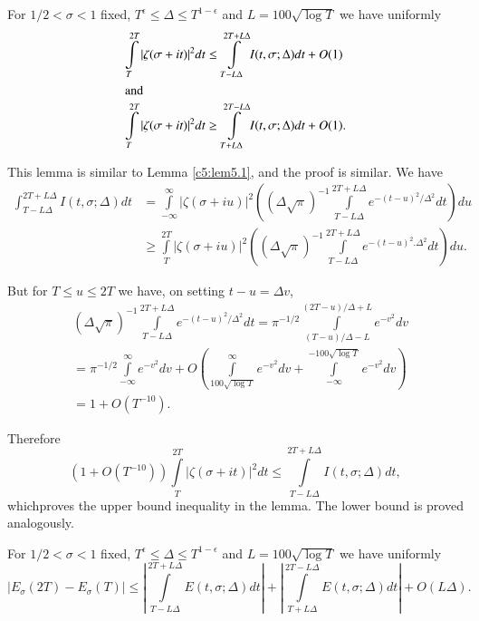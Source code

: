 \begin{lemma}\label{c2:lem2.4}
  For $1/2 < \sigma < 1$ fixed, $T^\epsilon \leq \Delta  \leq T^{1-
    \epsilon}$ and $L= 100 \sqrt{\log T}$ we have uniformly
  \begin{align*}
  \int\limits_T^{2T} |\zeta (\sigma + it)|^2 dt & \leq \int\limits_{T-
  L \Delta }^{2T + L \Delta } I (t, \sigma; \Delta ) dt + O(1)\\
  \intertext{and}
  \int\limits_T^{2T} |\zeta (\sigma + it)|^2 dt & \geq \int\limits_{T+
  L\Delta }^{2T- L\Delta } I (t, \sigma; \Delta ) dt + O(1).
  \end{align*}
\end{lemma}

\medskip
{} This lemma is similar to Lemma
\ref{c5:lem5.1}, and the proof is similar. We have
\begin{align*}
  \int_{T - L\Delta }^{2T+ L \Delta } I (t, \sigma; \Delta ) dt&
  = \int\limits_{- \infty}^\infty |\zeta(\sigma + iu)|^2 \left((\Delta 
  \sqrt{\pi})^{-1} \int\limits_{T- L \Delta }^{2T + L \Delta }
  e^{- (t-u)^2/\Delta ^2} dt\right) du\\
  & \geq \int\limits_T^{2T} |\zeta (\sigma + iu)|^2 \left((\Delta 
  \sqrt{\pi})^{-1} \int\limits_{T - L \Delta }^{2 T+ L \Delta }
  e^{- (t-u)^2.\Delta ^2} dt \right)du.
\end{align*}

But for $T \leq u \leq 2T$ we have, on setting $t- u = \Delta  v$,
\begin{align*}
  & (\Delta \sqrt{\pi})^{-1} \int\limits_{T- L\Delta }^{2T+ L
    \Delta } e^{- (t-u)^2/\Delta ^2} dt= \pi^{-1/2}
  \int\limits_{(T-u)/\Delta -L}^{(2 T-u)/\Delta  + L} e^{-v^2}
  dv\\
  & = \pi^{-1/2} \int\limits_{- \infty}^\infty e^{-v^2} dv + O
  \left(\int\limits_{100 \sqrt{\log T}}^\infty e^{- v^2} dv +
  \int\limits_{- \infty}^{-100 \sqrt{\log T}} e^{- v^2} dv  \right)\\
  & = 1+ O(T^{-10}).
\end{align*}

Therefore
$$
(1 + O (T^{-10})) \int\limits_T^{2T} |\zeta (\sigma + it)|^2 dt \leq
\int\limits_{T- L \Delta }^{2 T + L \Delta } I (t, \sigma;
\Delta ) dt,
$$
which\pageoriginale proves the upper bound inequality in the
lemma. The lower bound is proved analogously.

\begin{lemma}\label{c2:lem2.5}
  For $1/2 < \sigma < 1$ fixed, $T^\epsilon \leq \Delta  \leq
  T^{1-\epsilon}$ and $L = 100 \sqrt{\log T}$ we have uniformly
  $$
  |E_\sigma (2T)- E_\sigma (T)| \leq \left|\int\limits_{T- L
    \Delta }^{2T + L \Delta } E(t, \sigma; \Delta )dt \right| +
  \left| \int\limits_{T+ L\Delta }^{2T - L \Delta } E(t, \sigma ;
  \Delta ) dt \right| + O (L \Delta ).
  $$
\end{lemma}

